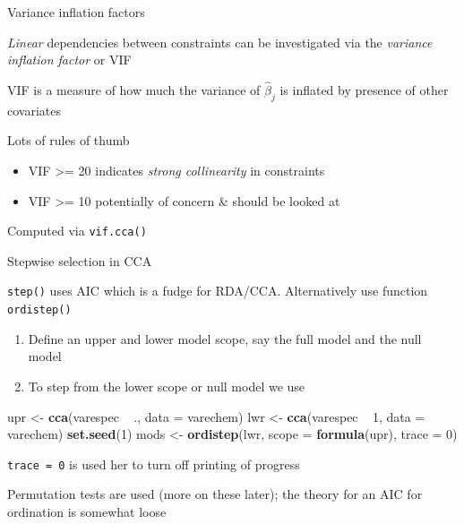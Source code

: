 \documentclass[10pt,ignorenonframetext,compress, aspectratio=169]{beamer}
\newenvironment{Shaded}{\begin{snugshade}}{\end{snugshade}}
\newcommand{\KeywordTok}[1]{\textcolor[rgb]{0.13,0.29,0.53}{\textbf{{#1}}}}
\newcommand{\DataTypeTok}[1]{\textcolor[rgb]{0.13,0.29,0.53}{{#1}}}
\newcommand{\DecValTok}[1]{\textcolor[rgb]{0.00,0.00,0.81}{{#1}}}
\newcommand{\StringTok}[1]{\textcolor[rgb]{0.31,0.60,0.02}{{#1}}}
\newcommand{\NormalTok}[1]{{#1}}
\providecommand{\tightlist}{%
  \setlength{\itemsep}{0pt}\setlength{\parskip}{0pt}}
\begin{document}
\begin{frame}[fragile]{Variance inflation factors}

\emph{Linear} dependencies between constraints can be investigated via
the \emph{variance inflation factor} or VIF

VIF is a measure of how much the variance of \(\hat{\beta}_j\) is
inflated by presence of other covariates

Lots of rules of thumb

\begin{itemize}
\tightlist
\item
  VIF \textgreater{}= 20 indicates \emph{strong collinearity} in
  constraints
\item
  VIF \textgreater{}= 10 potentially of concern \& should be looked at
\end{itemize}

Computed via \texttt{vif.cca()}

\end{frame}

\begin{frame}[fragile]{Stepwise selection in CCA}

\texttt{step()} uses AIC which is a fudge for RDA/CCA. Alternatively use
function \texttt{ordistep()}

\begin{enumerate}
\def\labelenumi{\arabic{enumi}.}
\tightlist
\item
  Define an upper and lower model scope, say the full model and the null
  model
\item
  To step from the lower scope or null model we use
\end{enumerate}

\scriptsize

\begin{Shaded}
\begin{Highlighting}[]
\NormalTok{upr <-}\StringTok{ }\KeywordTok{cca}\NormalTok{(varespec ~}\StringTok{ }\NormalTok{., }\DataTypeTok{data =} \NormalTok{varechem)}
\NormalTok{lwr <-}\StringTok{ }\KeywordTok{cca}\NormalTok{(varespec ~}\StringTok{ }\DecValTok{1}\NormalTok{, }\DataTypeTok{data =} \NormalTok{varechem)}
\KeywordTok{set.seed}\NormalTok{(}\DecValTok{1}\NormalTok{)}
\NormalTok{mods <-}\StringTok{ }\KeywordTok{ordistep}\NormalTok{(lwr, }\DataTypeTok{scope =} \KeywordTok{formula}\NormalTok{(upr), }\DataTypeTok{trace =} \DecValTok{0}\NormalTok{)}
\end{Highlighting}
\end{Shaded}

\normalsize

\texttt{trace\ =\ 0} is used her to turn off printing of progress

Permutation tests are used (more on these later); the theory for an AIC
for ordination is somewhat loose

\end{frame}
\end{document}
